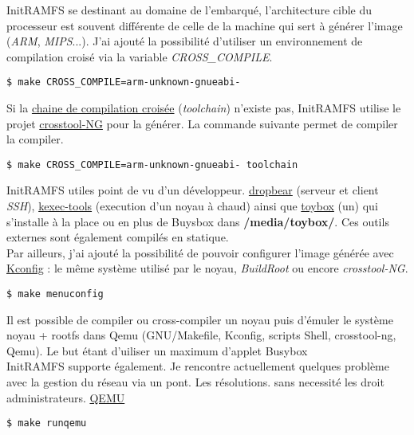 \documentclass[a4paper]{article}
\begin{document}
InitRAMFS se destinant au domaine de l'embarqué, l'architecture cible du processeur est souvent différente de celle de la machine qui sert à générer l'image (\textit{ARM}, \textit{MIPS}...). J'ai ajouté la possibilité d'utiliser un environnement de compilation croisé via la variable \textit{CROSS\_COMPILE}.
\begin{verbatim}
$ make CROSS_COMPILE=arm-unknown-gnueabi-
\end{verbatim}

Si la \href{https://fr.wikipedia.org/wiki/Cha\%C3\%AEne_de_compilation}{chaine de compilation croisée} (\textit{toolchain}) n'existe pas, InitRAMFS utilise le projet \href{http://crosstool-ng.org/}{crosstool-NG} pour la générer. La commande suivante permet de compiler la compiler.
\begin{verbatim}
$ make CROSS_COMPILE=arm-unknown-gnueabi- toolchain
\end{verbatim}

InitRAMFS utiles point de vu d'un développeur.
\href{https://matt.ucc.asn.au/dropbear/dropbear.html}{dropbear} (serveur et client \textit{SSH}), \href{http://git.kernel.org/cgit/utils/kernel/kexec/kexec-tools.git/}{kexec-tools} (execution d'un noyau à chaud) ainsi que \href{http://landley.net/toybox/}{toybox} (un) qui s'installe à la place ou en plus de Buysbox dans \textbf{/media/toybox/}. Ces outils externes sont également compilés en statique.\\

Par ailleurs, j'ai ajouté la possibilité de pouvoir configurer l'image générée avec \href{http://ymorin.is-a-geek.org/projects/kconfig-frontends}{Kconfig} : le même système utilisé par le noyau, \textit{BuildRoot} ou encore \textit{crosstool-NG}.
\begin{verbatim}
$ make menuconfig
\end{verbatim}

Il est possible de compiler ou cross-compiler un noyau puis d'émuler le système noyau + rootfs dans Qemu (GNU/Makefile, Kconfig, scripts Shell, crosstool-ng, Qemu).
Le but étant d'uiliser un maximum d'applet Busybox\\

InitRAMFS supporte également. Je rencontre actuellement quelques problème avec la gestion du réseau via un pont. Les résolutions. sans necessité les droit administrateurs.
\href{http://wiki.qemu.org}{QEMU}
\begin{verbatim}
$ make runqemu
\end{verbatim}
\end{document}

